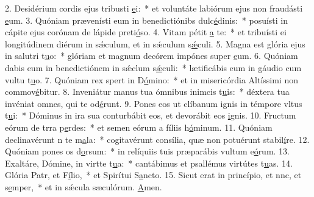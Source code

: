 2. Desidérium cordis ejus tribusti \uline{e}i:~* et voluntáte labiórum ejus non fraudásti \uline{e}um.
3. Quóniam prævenísti eum in benedictiónibs dulc\uline{é}dinis:~* posuísti in cápite ejus corónam de lápide preti\uline{ó}so.
4. Vitam pétit \uline{a} te:~* et tribuísti ei longitúdinem diérum in sǽculum, et in sǽculum s\uline{ǽ}culi.
5. Magna est glória ejus in salutri t\uline{u}o:~* glóriam et magnum decórem impónes super \uline{e}um.
6. Quóniam dabis eum in benedictiónem in sǽclum s\uline{ǽ}culi:~* lætificábis eum in gáudio cum vultu t\uline{u}o.
7. Quóniam rex spert in D\uline{ó}mino:~* et in misericórdia Altíssimi non commov\uline{é}bitur.
8. Inveniátur manus tua ómnibus inimcis t\uline{u}is:~* déxtera tua invéniat omnes, qui te od\uline{é}runt.
9. Pones eos ut clíbanum ignis in témpore vltus t\uline{u}i:~* Dóminus in ira sua conturbábit eos, et devorábit eos \uline{i}gnis.
10. Fructum eórum de trra p\uline{e}rdes:~* et semen eórum a fíliis h\uline{ó}minum.
11. Quóniam declinavérunt n te m\uline{a}la:~* cogitavérunt consília, quæ non potuérunt stabil\uline{í}re.
12. Quóniam pones os d\uline{o}rsum:~* in relíquiis tuis præparábis vultum e\uline{ó}rum.
13. Exaltáre, Dómine, in virtte t\uline{u}a:~* cantábimus et psallémus virtútes t\uline{u}as.
14. Glória Patr, et F\uline{í}lio,~* et Spirítui S\uline{a}ncto.
15. Sicut erat in princípio, et nnc, et s\uline{e}mper,~* et in sǽcula sæculórum. \uline{A}men.
